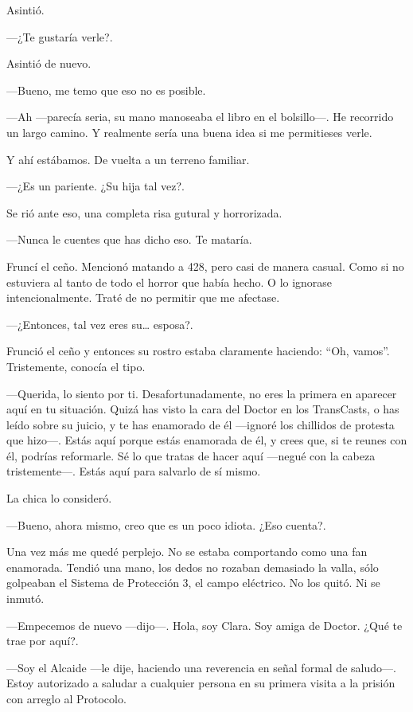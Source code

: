 Asintió.

---¿Te gustaría verle?.

Asintió de nuevo.

---Bueno, me temo que eso no es posible.

---Ah ---parecía seria, su mano manoseaba el libro en el bolsillo---. He
recorrido un largo camino. Y realmente sería una buena idea si me
permitieses verle.

Y ahí estábamos. De vuelta a un terreno familiar.

---¿Es un pariente. ¿Su hija tal vez?.

Se rió ante eso, una completa risa gutural y horrorizada.

---Nunca le cuentes que has dicho eso. Te mataría.

Fruncí el ceño. Mencionó matando a 428, pero casi de manera casual. Como
si no estuviera al tanto de todo el horror que había hecho. O lo
ignorase intencionalmente. Traté de no permitir que me afectase.

---¿Entonces, tal vez eres su\ldots{} esposa?.

Frunció el ceño y entonces su rostro estaba claramente haciendo: ``Oh,
vamos''. Tristemente, conocía el tipo.

---Querida, lo siento por ti. Desafortunadamente, no eres la primera en
aparecer aquí en tu situación. Quizá has visto la cara del Doctor en los
TransCasts, o has leído sobre su juicio, y te has enamorado de él
---ignoré los chillidos de protesta que hizo---. Estás aquí porque estás
enamorada de él, y crees que, si te reunes con él, podrías reformarle.
Sé lo que tratas de hacer aquí ---negué con la cabeza tristemente---.
Estás aquí para salvarlo de sí mismo.

La chica lo consideró.

---Bueno, ahora mismo, creo que es un poco idiota. ¿Eso cuenta?.

Una vez más me quedé perplejo. No se estaba comportando como una fan
enamorada. Tendió una mano, los dedos no rozaban demasiado la valla,
sólo golpeaban el Sistema de Protección 3, el campo eléctrico. No los
quitó. Ni se inmutó.

---Empecemos de nuevo ---dijo---. Hola, soy Clara. Soy amiga de Doctor.
¿Qué te trae por aquí?.

---Soy el Alcaide ---le dije, haciendo una reverencia en señal formal de
saludo---. Estoy autorizado a saludar a cualquier persona en su primera
visita a la prisión con arreglo al Protocolo.

